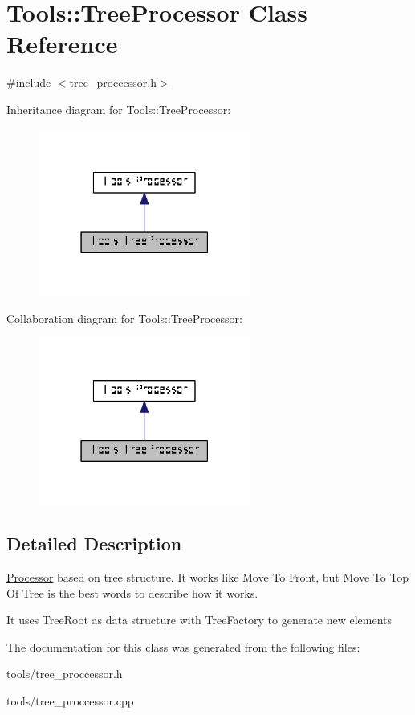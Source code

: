 \hypertarget{classTools_1_1TreeProcessor}{\section{Tools\-:\-:Tree\-Processor Class Reference}
\label{classTools_1_1TreeProcessor}
}


{\ttfamily \#include $<$tree\-\_\-proccessor.\-h$>$}



Inheritance diagram for Tools\-:\-:Tree\-Processor\-:\nopagebreak
\begin{figure}[H]
\begin{center}
\leavevmode
\includegraphics[width=198pt]{classTools_1_1TreeProcessor__inherit__graph}
\end{center}
\end{figure}


Collaboration diagram for Tools\-:\-:Tree\-Processor\-:\nopagebreak
\begin{figure}[H]
\begin{center}
\leavevmode
\includegraphics[width=198pt]{classTools_1_1TreeProcessor__coll__graph}
\end{center}
\end{figure}


\subsection{Detailed Description}
\hyperlink{classTools_1_1Processor}{Processor} based on tree structure. It works like Move To Front, but Move To Top Of Tree is the best words to describe how it works.

It uses Tree\-Root as data structure with Tree\-Factory to generate new elements 

The documentation for this class was generated from the following files\-:\begin{DoxyCompactItemize}
\item 
tools/tree\-\_\-proccessor.\-h\item 
tools/tree\-\_\-proccessor.\-cpp\end{DoxyCompactItemize}
